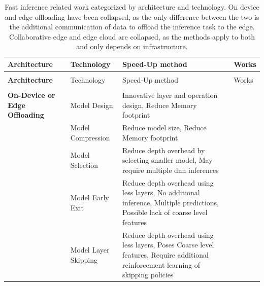 \begin{minipage}[t]{\linewidth}
\begin{footnotesize}
\begin{longtabu}{>{\bfseries}X[c]|X[c]|X[3c]|X[0.5c]}
	\caption[Fast Inference Related Work]{Fast inference related work categorized by architecture and technology. On device and edge offloading have been collapsed, as the only difference between the two is the additional communication of data to offload the inference task to the edge. Collaborative edge and edge cloud are collapsed, as the methods apply to both and only depends on infrastructure.} \label{tbl:fast-inference} \\
	\toprule
	\rowfont{\bfseries}
	Architecture & Technology & Speed-Up method & Works \tabularnewline
	\hline
	\endfirsthead
	\\
	\toprule
	\rowfont{\bfseries}
	Architecture & Technology & Speed-Up method & Works \tabularnewline
	\hline
	\endhead %
	\hline
	\\
	\endfoot
	\hline
	\endlastfoot
	On-Device or Edge Offloading & Model Design & Innovative layer and operation design, Reduce Memory footprint & \cite{iandola_squeezenet:_2016,howard_mobilenets:_2017,sandler_mobilenetv2:_2018, zhang_shufflenet:_2017, ma_shufflenet_2018} \tabularnewline
	
	& Model Compression & Reduce model size, Reduce Memory footprint &  \cite{hinton_distilling_2015,courbariaux_binaryconnect:_2015,courbariaux_binarized_2016,romero_fitnets:_2014} \tabularnewline	
	
	& Model Selection & Reduce depth overhead by selecting smaller model, May require multiple \gls{dnn} inferences & \cite{bolukbasi_adaptive_2017, tann_flexible_2018, park_big/little_2015} \tabularnewline
	
	& Model Early Exit & Reduce depth overhead using less layers, No additional inference, Multiple predictions, Possible lack of coarse level features & \cite{leroux_resource-constrained_2015,teerapittayanon_branchynet:_2016, berestizshevsky_sacrificing_2019, kaya_shallow-deep_nodate, huang_multi-scale_2017} \tabularnewline
	& Model Layer Skipping & Reduce depth overhead using less layers, Poses Coarse level features, Require additional reinforcement learning of skipping policies & \cite{wang_skipnet:_2017,wu_blockdrop:_2017} \tabularnewline\hline
		

\end{longtabu}
\end{footnotesize}
\end{minipage}
